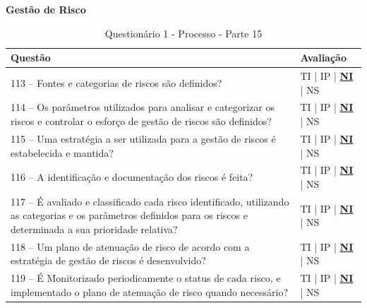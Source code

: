 \documentclass[openany,10pt,a4paper]{article}
\begin{document}
\begin{appendix}
	\begin{table}[h]
	\textbf{Gestão de Risco}
		\centering
		\caption{Questionário 1 - Processo - Parte 15}
		\begin{tabular}{p{5in}p{1in}}		
			\toprule
			\textbf{Questão}  & \textbf{Avaliação}\\ 
			\midrule
			113 – Fontes e categorias de riscos são definidos?
	 & TI | IP | \underline{\textbf{NI}} | NS \\
			\midrule
			114 – Os parâmetros utilizados para analisar e categorizar os riscos e controlar o esforço de 
	gestão de riscos são definidos?
	 & TI | IP | \underline{\textbf{NI}} | NS \\
			\midrule
			115 – Uma estratégia a ser utilizada para a gestão de riscos é estabelecida e mantida?
	 & TI | IP | \underline{\textbf{NI}} | NS \\
			\midrule
			116 – A identificação e documentação dos riscos é feita?
	 & TI | IP | \underline{\textbf{NI}} | NS \\
			\midrule
		117 – É avaliado e classificado cada risco identificado, utilizando as categorias e os parâmetros 
	definidos para os riscos e determinada a sua prioridade relativa?
	  & TI | IP | \underline{\textbf{NI}} | NS \\
			\midrule
			118 – Um plano de atenuação de risco de acordo com a estratégia de gestão de riscos é 
	desenvolvido?
	 & TI | IP | \underline{\textbf{NI}} | NS \\
	 \midrule
			119 – É Monitorizado periodicamente o status de cada risco, e implementado o plano de 
	atenuação de risco quando necessário?
	 & TI | IP | \underline{\textbf{NI}} | NS \\
			\bottomrule
		\end{tabular} 
	\end{table}
	

\end{appendix}
\end{document}
